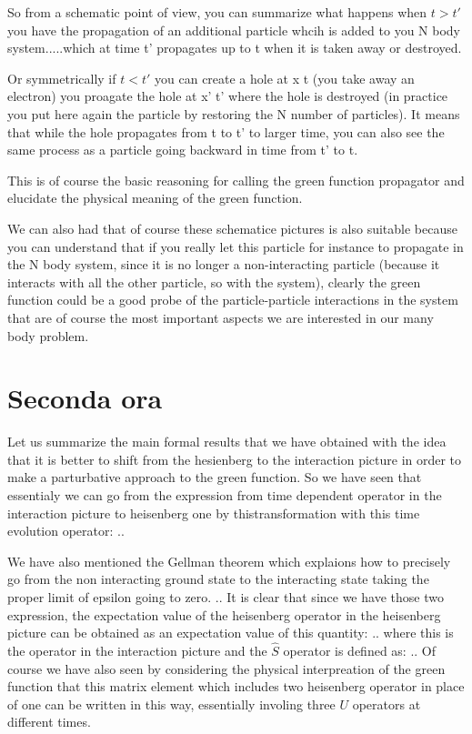 \documentclass[../main/main.tex]{subfiles}
\begin{document}
So from a schematic point of view, you can summarize what happens when \( t>t' \) you have the propagation of an additional particle whcih is added to you N body system.....which at time t' propagates up to t when it is taken away or destroyed.

Or symmetrically if \( t<t' \) you can create a hole at x t (you take away an electron) you proagate the hole at x' t' where the hole is destroyed (in practice you put here again the particle by restoring the N number of particles).
It means that while the hole propagates from t to t' to larger time, you can also see the same process as a particle going backward in time from t' to t.

This is of course the basic reasoning for calling the green function propagator and elucidate the physical meaning of the green function.

We can also had that of course these schematice pictures is also suitable because you can understand  that if you really let this particle for instance to propagate in the N body system, since it is no longer a non-interacting particle (because it interacts with all the other particle, so with the system), clearly the green function could be a good probe of the particle-particle interactions in the system that are of course the most important aspects we are interested in our many body problem.


\section{Seconda ora}
Let us summarize the main formal results that we have obtained with the idea that it is better to shift from the hesienberg to the interaction picture in order to make a parturbative approach to the green function.
So we have seen that essentialy we can go from the expression from time dependent operator in the interaction picture to heisenberg one by thistransformation with this time evolution operator:
..

We have also mentioned the Gellman theorem which explaions how to precisely go from the non interacting ground state to the interacting state taking the proper limit of epsilon going to zero.
..
It is clear that since we have those two expression, the expectation value of the heisenberg operator in the heisenberg picture can be obtained as an expectation value of this quantity:
..
where this is the operator in the interaction picture and the \( \hat{S}  \) operator is defined as:
..
Of course we have also seen by considering the physical interpreation of the green function that this matrix element which includes two heisenberg operator in place of one can be written in this way, essentially involing three \( U \) operators at different times.
\end{document}

